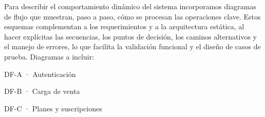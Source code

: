 Para describir el comportamiento dinámico del sistema incorporamos diagramas de flujo que muestran, paso a paso, cómo se procesan las operaciones clave. Estos esquemas complementan a los requerimientos y a la arquitectura estática, al hacer explícitas las secuencias, los puntos de decisión, los caminos alternativos y el manejo de errores, lo que facilita la validación funcional y el diseño de casos de prueba.
\vspace{1cm}
Diagramas a incluir:

DF-A · Autenticación

DF-B · Carga de venta

DF-C · Planes y suscripciones

